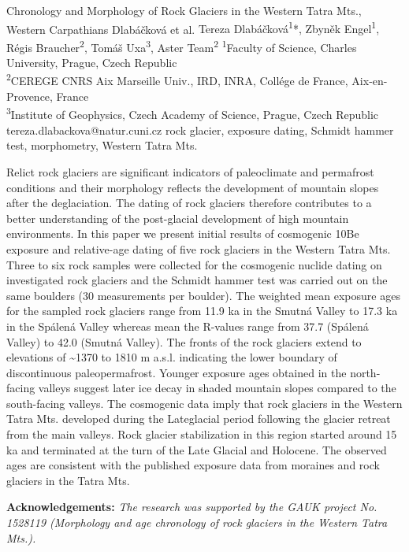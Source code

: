 
\abstract
{Chronology and Morphology of Rock Glaciers in the Western Tatra Mts., Western Carpathians} 
{Dlabáčková et al.} 
{Tereza Dlabáčková\textsuperscript{1}*, Zbyněk Engel\textsuperscript{1}, Régis Braucher\textsuperscript{2}, Tomáš Uxa\textsuperscript{3}, Aster Team\textsuperscript{2}} 
{\POtag} 
{
\textsuperscript{1}Faculty of Science, Charles University, Prague, Czech Republic \\
\textsuperscript{2}CEREGE CNRS Aix Marseille Univ., IRD, INRA, Collége de France, Aix-en-Provence, France\\
\textsuperscript{3}Institute of Geophysics, Czech Academy of Science, Prague, Czech Republic
}
{tereza.dlabackova@natur.cuni.cz}  %
{rock glacier, exposure dating, Schmidt hammer test, morphometry, Western Tatra Mts.}
{Relict rock glaciers are significant indicators of paleoclimate and permafrost conditions and their morphology reflects the development of mountain slopes after the deglaciation. The dating of rock glaciers therefore contributes to a better understanding of the post-glacial development of high mountain environments. In this paper we present initial results of cosmogenic 10Be exposure and relative-age dating of five rock glaciers in the Western Tatra Mts. Three to six rock samples were collected for the cosmogenic nuclide dating on investigated rock glaciers and the Schmidt hammer test was carried out on the same boulders (30 measurements per boulder). The weighted mean exposure ages for the sampled rock glaciers range from 11.9 ka in the Smutná Valley to 17.3 ka in the Spálená Valley whereas mean the R-values range from 37.7 (Spálená Valley) to 42.0 (Smutná Valley). The fronts of the rock glaciers extend to elevations of \textasciitilde1370 to 1810 m a.s.l. indicating the lower boundary of discontinuous paleopermafrost. Younger exposure ages obtained in the north-facing valleys suggest later ice decay in shaded mountain slopes compared to the south-facing valleys. The cosmogenic data imply that rock glaciers in the Western Tatra Mts. developed during the Lateglacial period following the glacier retreat from the main valleys.  Rock glacier stabilization in this region started around 15 ka and terminated at the turn of the Late Glacial and Holocene. The observed ages are consistent with the published exposure data from moraines and rock glaciers in the Tatra Mts.

\vspace{0.5em}
\noindent
\textbf{Acknowledgements:}
\textit{The research was supported by the GAUK project No. 1528119 (Morphology and age chronology of rock glaciers in the Western Tatra Mts.).}
	
}
{
}

